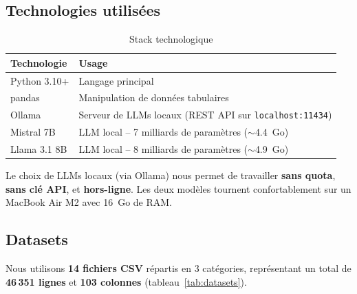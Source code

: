 \documentclass[12pt,a4paper]{article}
\begin{document}
\subsection{Technologies utilis\'{e}es}

\begin{table}[H]
\centering
\caption{Stack technologique}
\begin{tabular}{@{}ll@{}}
\toprule
\textbf{Technologie} & \textbf{Usage} \\
\midrule
Python 3.10+ & Langage principal \\
pandas & Manipulation de donn\'{e}es tabulaires \\
Ollama & Serveur de LLMs locaux (REST API sur \texttt{localhost:11434}) \\
Mistral 7B & LLM local -- 7 milliards de param\`{e}tres ($\sim$4.4~Go) \\
Llama 3.1 8B & LLM local -- 8 milliards de param\`{e}tres ($\sim$4.9~Go) \\
\bottomrule
\end{tabular}
\end{table}

Le choix de LLMs locaux (via Ollama) nous permet de travailler \textbf{sans quota}, \textbf{sans cl\'{e} API}, et \textbf{hors-ligne}. Les deux mod\`{e}les tournent confortablement sur un MacBook Air M2 avec 16~Go de RAM.

\subsection{Datasets}

Nous utilisons \textbf{14 fichiers CSV} r\'{e}partis en 3 cat\'{e}gories, repr\'{e}sentant un total de \textbf{46\,351 lignes} et \textbf{103 colonnes} (tableau~\ref{tab:datasets}).
\end{document}
